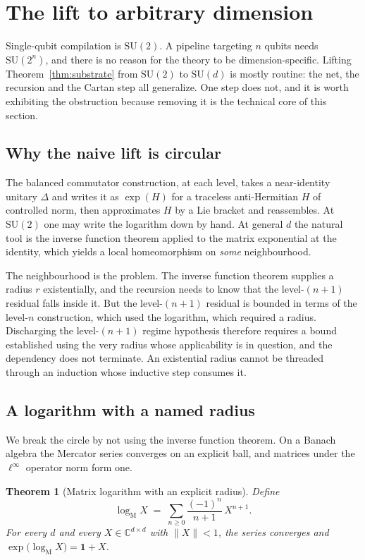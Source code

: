 \documentclass[aps,pra,reprint,nofootinbib,superscriptaddress]{revtex4-2}
\newcommand{\su}[1]{\mathrm{SU}(#1)}
\newcommand{\opn}[1]{\lVert #1 \rVert}
\theoremstyle{plain}
\newtheorem{theorem}{Theorem}
\theoremstyle{definition}
\begin{document}
\section{The lift to arbitrary dimension}
\label{sec:sud}

Single-qubit compilation is $\su 2$. A pipeline targeting $n$ qubits needs
$\su{2^n}$, and there is no reason for the theory to be dimension-specific.
Lifting Theorem~\ref{thm:substrate} from $\su 2$ to $\su d$ is mostly routine:
the net, the recursion and the Cartan step all generalize. One step does not,
and it is worth exhibiting the obstruction because removing it is the technical
core of this section.

\subsection{Why the naive lift is circular}

The balanced commutator construction, at each level, takes a near-identity
unitary $\Delta$ and writes it as $\exp(H)$ for a traceless anti-Hermitian $H$
of controlled norm, then approximates $H$ by a Lie bracket and reassembles. At
$\su 2$ one may write the logarithm down by hand. At general $d$ the natural
tool is the inverse function theorem applied to the matrix exponential at the
identity, which yields a local homeomorphism on \emph{some} neighbourhood.

The neighbourhood is the problem. The inverse function theorem supplies a radius
$r$ existentially, and the recursion needs to know that the level-$(n+1)$
residual falls inside it. But the level-$(n+1)$ residual is bounded in terms of
the level-$n$ construction, which used the logarithm, which required a radius.
Discharging the level-$(n+1)$ regime hypothesis therefore requires a bound
established using the very radius whose applicability is in question, and the
dependency does not terminate. An existential radius cannot be threaded through
an induction whose inductive step consumes it.

\subsection{A logarithm with a named radius}

We break the circle by not using the inverse function theorem. On a Banach
algebra the Mercator series converges on an explicit ball, and matrices under
the $\ell^\infty$ operator norm form one.

\begin{theorem}[Matrix logarithm with an explicit radius]
\label{thm:mercator}
Define
\[
  \log_{\mathrm{M}} X \;=\; \sum_{n \ge 0} \frac{(-1)^n}{n+1}\,X^{n+1}.
\]
For every $d$ and every $X \in \mathbb{C}^{d\times d}$ with $\opn{X} < 1$, the
series converges and
$\exp\big(\log_{\mathrm{M}} X\big) = \mathbf 1 + X$.
\end{theorem}
\end{document}
